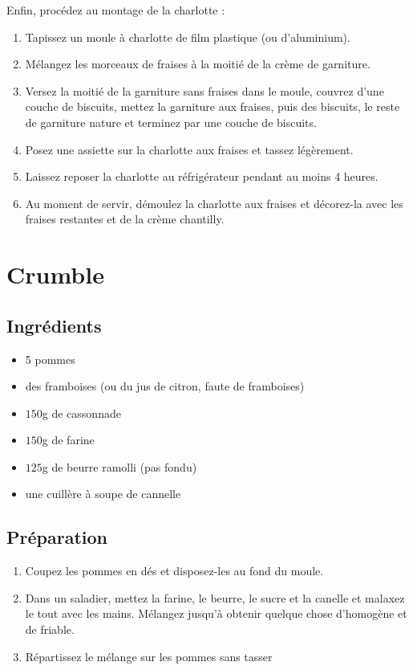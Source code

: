 Enfin, procédez au montage de la charlotte :

\begin{enumerate}
\item Tapissez un moule à charlotte de film plastique (ou d'aluminium).
\item Mélangez les morceaux de fraises à la moitié de la crème de garniture.
\item Versez la moitié de la garniture sans fraises dans le moule, couvrez d'une couche de biscuits, mettez la garniture aux fraises, puis des biscuits, le reste de garniture nature et terminez par une couche de biscuits.
\item Posez une assiette sur la charlotte aux fraises et tassez légèrement.
\item Laissez reposer la charlotte au réfrigérateur pendant au moins 4 heures.
\item Au moment de servir, démoulez la charlotte aux fraises et décorez-la avec les fraises restantes et de la crème chantilly.
\end{enumerate}

\newpage
\section{Crumble}
\subsection*{Ingrédients}
\begin{itemize}
\item 5 pommes
\item des framboises (ou du jus de citron, faute de framboises)
\item $150$g de cassonnade
\item $150$g de farine
\item $125$g de beurre ramolli (pas fondu)
\item une cuillère à soupe de cannelle
\end{itemize}

\subsection*{Préparation}
\begin{enumerate}
\item Coupez les pommes en dés et disposez-les au fond du moule.
\item Dans un saladier, mettez la farine, le beurre, le sucre et la canelle et malaxez le tout avec les mains. Mélangez jusqu'à obtenir quelque chose d'homogène et de friable.
\item Répartissez le mélange sur les pommes sans tasser
\end{enumerate}

